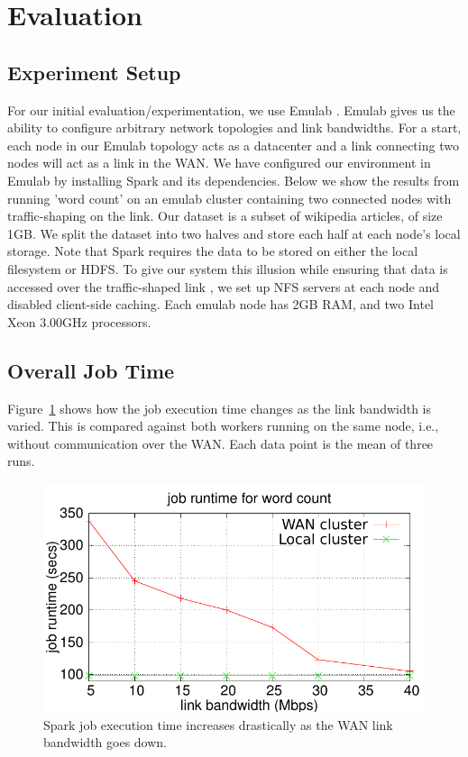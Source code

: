 \section{Evaluation}

\subsection{Experiment Setup}
For our initial evaluation/experimentation, we use Emulab \cite{2}. Emulab gives us the ability to configure arbitrary network topologies and link bandwidths. For a start, each node in our Emulab topology acts as a datacenter and a link connecting two nodes will act as a link in the WAN. We have configured our environment in Emulab by installing Spark and its dependencies.  Below we show the results from running 'word count' on an emulab cluster containing two connected nodes with traffic-shaping on the link. Our dataset is a subset of wikipedia articles, of size 1GB. We split the dataset into two halves and store each half at each node's local storage. Note that Spark requires the data to be stored on either the local filesystem or HDFS. To give our system this illusion while ensuring that data is accessed over the traffic-shaped link , we set up NFS servers at each node and disabled client-side caching. Each emulab node has 2GB RAM, and two Intel Xeon 3.00GHz processors.

\subsection{Overall Job Time}
Figure~\ref{fig:job-time} shows how the job execution time changes as the link bandwidth is varied. This is compared against both workers running on the same node, i.e., without communication over the WAN. Each data point is the mean of three runs. 

\begin{figure}[tb]
\centering\includegraphics[width=\columnwidth]{figs/job-time.pdf}
\vspace{-1.2em}
\caption{Spark job execution time increases drastically as the WAN link bandwidth goes down.}
\label{fig:job-time}
\vspace{.7em}
\end{figure}


